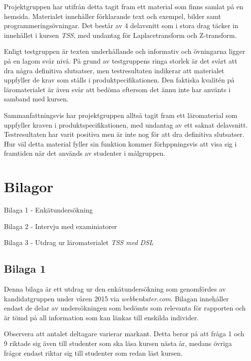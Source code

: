 \documentclass[12pt,a4paper,twoside,openright]{article}
\begin{document}
Projektgruppen har utifrån detta tagit fram ett material som finns
samlat på en hemsida. Materialet innehåller förklarande text och exempel, bilder
samt programmeringsövningar. Det består av 4 delavsnitt
som i stora drag täcker  in innehållet i kursen \textit{TSS}, med
undantag för Laplacetransform och Z-transform.

Enligt testgruppen är texten underhållande och informativ och
 övningarna ligger på en lagom svår nivå. På grund av testgruppens
ringa storlek är det svårt att dra några definitiva slutsatser,
men testresultaten indikerar att materialet uppfyller de krav
som ställs i produktpecifikationen. Den faktiska kvalitén på
 läromaterialet är även svår att bedöma eftersom det
ännu inte har använts i samband med kursen.

Sammanfattningsvis har projektgruppen alltså tagit
fram ett läromaterial som uppfyller kraven i produktspecifikationen,
med undantag av ett saknat delavsnitt. Testresultaten har varit
positiva men är inte nog för att dra definitiva slutsatser. Hur väl detta
material fyller sin funktion kommer förhppningsvis att
visa sig i framtiden när det används av studenter i målgruppen.

\newpage





\newpage

\section{Bilagor}
Bilaga 1 - Enkätundersökning

Bilaga 2 - Intervju med examiniatorer

Bilaga 3 - Utdrag ur läromaterialet \textit{TSS med DSL}
\subsection{Bilaga 1}
\label{bil:1}
Denna bilaga är ett utdrag ur den enkätundersökning som genomfördes av
kandidatgruppen under våren 2015 via \textit{webbenkater.com}. Bilagan
innehåller endast de delar av undersökningen som bedömts som relevanta
för rapporten och är tömd på all information som kan länkas till
enskilda individer.

Observera att antalet deltagare varierar markant. Detta beror på att
 fråga 1 och 9 riktade sig även till studenter som ska läsa kursen nästa
år, medans övriga frågor endast riktar sig till studenter som redan läst
kursen.
\end{document}
